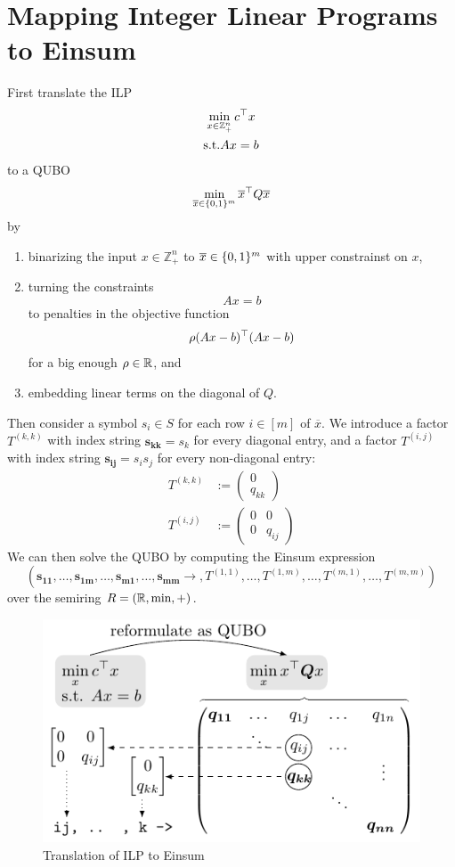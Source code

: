 \chapter{Mapping Integer Linear Programs to Einsum}
\label{chap:appendix:map_ilp}

First translate the ILP
\begin{gather*}
    \min_{x \in \mathbb{Z}_+^n} c^\top x\\
    \text{s.t.} Ax = b
\end{gather*}
to a QUBO
$$\min_{\overline{x} \in \lbrace 0,1 \rbrace^m} \overline{x}^\top Q \overline{x}$$
by
\begin{enumerate}[label={\arabic*.}]
    \item binarizing the input $x \in \mathbb{Z}_+^n$ to $\overline{x} \in \lbrace 0,1 \rbrace^m$ with upper constrainst on $x$,
    \item turning the constraints $$Ax = b$$ to penalties in the objective function $$\rho (Ax - b)^\top (Ax - b)$$ for a big enough $\rho \in \mathbb{R}$, and
    \item embedding linear terms on the diagonal of $Q$.
\end{enumerate}

Then consider a symbol $s_i \in S$ for each row $i \in [m]$ of $\overline{x}$.
We introduce a factor $T^{(k, k)}$ with index string $\bm{s_{kk}} = s_k$ for every diagonal entry, and a factor $T^{(i,j)}$ with index string $\bm{s_{ij}} = s_i s_j$ for every non-diagonal entry:
\begin{align*}
    T^{(k, k)} & := \begin{pmatrix}
        0 \\
        q_{kk}
    \end{pmatrix} \\
    T^{(i,j)}  & := \begin{pmatrix}
        0 & 0      \\
        0 & q_{ij}
    \end{pmatrix}
\end{align*}
We can then solve the QUBO by computing the Einsum expression
$$(\bm{s_{11}}, \dots, \bm{s_{1m}}, \dots, \bm{s_{m1}}, \dots, \bm{s_{mm}} \rightarrow, T^{(1,1)}, \dots, T^{(1,m)}, \dots, T^{(m,1)}, \dots, T^{(m, m)})$$
over the semiring $R = (\mathbb{R}, \min, +)$.

\begin{figure}[h]
    \centering
    \includegraphics{graphics/ilp.pdf}
    \caption{Translation of ILP to Einsum}
    \label{fig:appendix:map_ilp:ilp_to_einsum}
\end{figure}